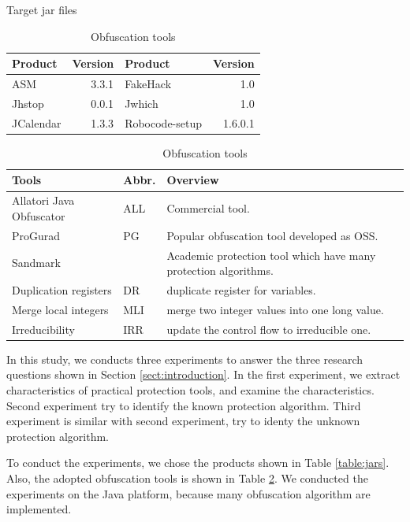 \documentclass[conference]{IEEEtran}
\begin{document}
\begin{table}[t]
  \centering
  \footnotesize{
    \caption{Target jar files}\label{table:jars}
  \begin{tabular}{l|r||l|r}
    {\bf Product} & {\bf Version} & {\bf Product} & {\bf Version} \\ \hline
    ASM       & 3.3.1 & FakeHack  & 1.0 \\
    Jhstop    & 0.0.1 & Jwhich    & 1.0  \\
    JCalendar & 1.3.3 & Robocode-setup & 1.6.0.1  \\
  \end{tabular}
  \vspace{0.5cm}
  \caption{Obfuscation tools}\label{table:tools}
  \begin{tabular}{ll|p{4cm}}
      {\bf Tools} & {\bf Abbr.} & {\bf Overview} \\ \hline
      Allatori Java Obfuscator & ALL & Commercial tool. \\ \hline
      ProGurad                 & PG  & Popular obfuscation tool developed as OSS. \\ \hline
      Sandmark                 &     & Academic protection tool which have many protection algorithms. \\
      \hspace{0.1cm} Duplication registers & DR & duplicate register for variables. \\
      \hspace{0.1cm} Merge local integers & MLI & merge two integer values into one long value.\\
      \hspace{0.1cm} Irreducibility       & IRR & update the control flow to irreducible one.\\
  \end{tabular}}
\end{table}

In this study, we conducts three experiments to answer the three
research questions shown in Section \ref{sect:introduction}.  In the
first experiment, we extract characteristics of practical protection
tools, and examine the characteristics.
%
Second experiment try to identify the known protection algorithm.
Third experiment is similar with second experiment, try to identy the
unknown protection algorithm.

To conduct the experiments, we chose the products shown in Table
\ref{table:jars}.  Also, the adopted obfuscation tools is shown in
Table \ref{table:tools}.  We conducted the experiments on the Java
platform, because many obfuscation algorithm are implemented.
\end{document}
